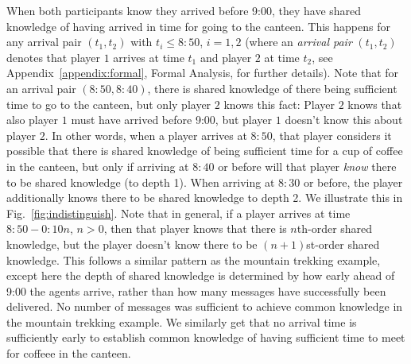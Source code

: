 \documentclass[twocolumn,a4paper,superscriptaddress,nofootinbib]{revtex4}
\begin{document}
When both participants know they arrived before 9:00, they have shared knowledge of having arrived in time for going to the canteen. This happens for any arrival pair $(t_1,t_2)$ with $t_i \leq 8{:}50$, $i=1,2$ (where an \emph{arrival pair} $(t_1,t_2)$ denotes that player $1$ arrives at time $t_1$ and player $2$ at time $t_2$, see Appendix~\ref{appendix:formal}, Formal Analysis, for further details). Note that for an arrival pair $(8{:}50,8{:}40)$, there is shared knowledge of there being sufficient time to go to the canteen, but only player $2$ knows this fact: Player $2$ knows that also player $1$ must have arrived before 9{:}00, but player $1$ doesn't know this about player $2$. In other words, when a player arrives at $8{:}50$, that player considers it possible that there is shared knowledge of being sufficient time for a cup of coffee in the canteen, but only if arriving at $8{:}40$ or before will that player \emph{know} there to be shared knowledge (to depth 1). When arriving at $8{:}30$ or before, the player additionally knows there to be shared knowledge to depth 2. We illustrate this in Fig.~\ref{fig:indistinguish}. Note that in general, if a player arrives at time $8{:}50-0{:}10n$, $n>0$, then that player knows that there is $n$th-order shared knowledge, but the player doesn't know there to be $(n+1)$st-order shared knowledge. This follows a similar pattern as the mountain trekking example, except here the depth of shared knowledge is determined by how early ahead of 9:00 the agents arrive, rather than how many messages have successfully been delivered. No number of messages was sufficient to achieve common knowledge in the mountain trekking example. We similarly get that no arrival time is sufficiently early to establish common knowledge of having sufficient time to meet for coffeee in the canteen. 
\end{document}
